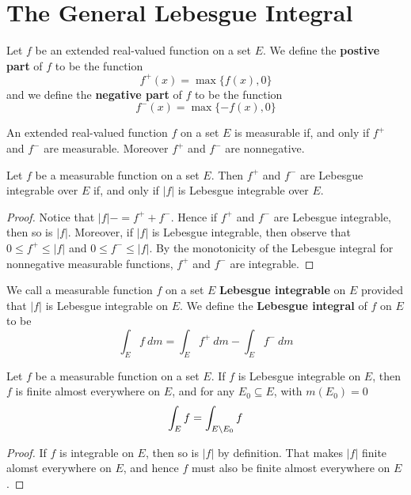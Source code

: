 \section{The General Lebesgue Integral}

\begin{definition}
    Let $f$ be an extended real-valued function on a set  $E$. We define the
     \textbf{postive part} of $f$ to be the function
     \begin{equation*}
         f^+(x)=\max{\{f(x),0\}}
     \end{equation*}
     and we define the \textbf{negative part} of $f$ to be the function
     \begin{equation*}
         f^-(x)=\max{\{-f(x),0\}}
     \end{equation*}
\end{definition}

\begin{lemma}\label{10.3.1}
    An extended real-valued function $f$ on a set  $E$ is measurable if, and only
    if  $f^+$ and  $f^-$ are measurable. Moreover  $f^+$ and  $f^-$ are
    nonnegative.
\end{lemma}

\begin{lemma}\label{10.3.2}
    Let $f$ be a measurable function on a set  $E$. Then  $f^+$ and  $f^-$ are
    Lebesgue integrable over  $E$ if, and only if  $|f|$ is Lebesgue integrable
    over  $E$.
\end{lemma}
\begin{proof}
    Notice that $|f|-=f^++f^-$. Hence if  $f^+$ and  $f^-$ are Lebesgue
    integrable, then so is  $|f|$. Moreover, if  $|f|$ is Lebesgue integrable,
    then observe that  $0 \leq f^+ \leq |f|$ and  $0 \leq f^- \leq |f|$. By the
    monotonicity of the Lebesgue integral for nonnegative measurable functions,
     $f^+$ and  $f^-$ are integrable.
\end{proof}

\begin{definition}
    We call a measurable function $f$ on a set  $E$  \textbf{Lebesgue
    integrable} on $E$ provided that  $|f|$ is Lebesgue integrable on  $E$. We
    define the \textbf{Lebesgue integral} of $f$ on $E$ to be
    \begin{equation*}
        \int_E{f \ dm}=\int_E{f^+ \ dm}-\int_E{f^- \ dm}
    \end{equation*}
\end{definition}

\begin{lemma}\label{10.3.3}
    Let $f$ be a measurable function on a set  $E$. If  $f$ is Lebesgue
    integrable on  $E$, then  $f$ is finite almost everywhere on  $E$, and for
    any $E_0 \subseteq E$, with $m(E_0)=0$
    \begin{equation*}
        \int_E{f}=\int_{E \backslash E_0}{f}
    \end{equation*}
\end{lemma}
\begin{proof}
    If $f$ is integrable on $E$, then so is  $|f|$ by definition. That makes
    $|f|$ finite alomst everywhere on  $E$, and hence  $f$ must also be finite
    almost everywhere on  $E$.
\end{proof}

